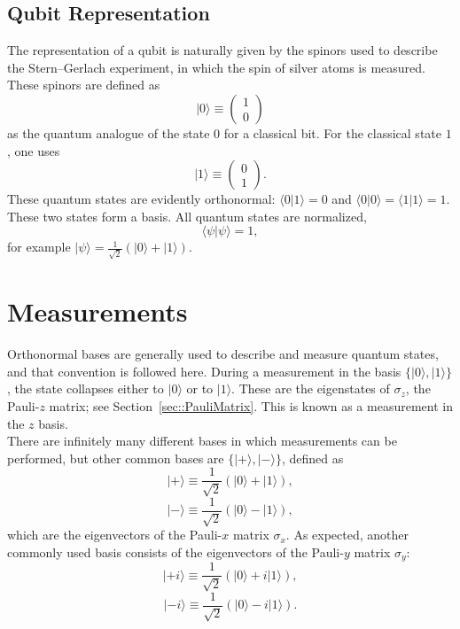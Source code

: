 \documentclass[a4paper]{article}
\begin{document}
\subsection{Qubit Representation}
The representation of a qubit is naturally given by the spinors used to describe the Stern--Gerlach experiment, in which the spin of silver atoms is measured. These spinors are defined as
\begin{equation}\label{eq::qubit0}
|0\rangle\equiv
\begin{pmatrix}
		1\\
		0
	\end{pmatrix}
\end{equation}
as the quantum analogue of the state $0$ for a classical bit. For the classical state $1$, one uses
\begin{equation}\label{eq::qubit1}
|1\rangle\equiv
\begin{pmatrix}
		0\\
		1
	\end{pmatrix}.
\end{equation}
These quantum states are evidently orthonormal: $\langle 0 | 1\rangle=0$ and $\langle 0 | 0\rangle=\langle 1 | 1\rangle=1$. These two states form a basis. All quantum states are normalized,
\begin{equation}
\langle \psi | \psi\rangle=1,
\end{equation}
for example $|\psi\rangle=\frac{1}{\sqrt{2}}(|0\rangle+|1\rangle)$.

\section{Measurements}
Orthonormal bases are generally used to describe and measure quantum states, and that convention is followed here. During a measurement in the basis $\{|0\rangle, |1\rangle\}$, the state collapses either to $|0\rangle$ or to $|1\rangle$. These are the eigenstates of $\sigma_z$, the Pauli-$z$ matrix; see Section~\ref{sec::PauliMatrix}. This is known as a measurement in the $z$ basis.\\
There are infinitely many different bases in which measurements can be performed, but other common bases are $\{|+\rangle, |-\rangle \}$, defined as
\begin{equation}
|+\rangle\equiv\frac{1}{\sqrt{2}}(|0\rangle+|1\rangle),
\end{equation}
\begin{equation}
|-\rangle\equiv\frac{1}{\sqrt{2}}(|0\rangle-|1\rangle),
\end{equation}
which are the eigenvectors of the Pauli-$x$ matrix $\sigma_x$. As expected, another commonly used basis consists of the eigenvectors of the Pauli-$y$ matrix $\sigma_y$:
\begin{equation}
|+i\rangle\equiv\frac{1}{\sqrt{2}}(|0\rangle+i|1\rangle),
\end{equation}
\begin{equation}
|-i\rangle\equiv\frac{1}{\sqrt{2}}(|0\rangle-i|1\rangle).
\end{equation}
\end{document}
